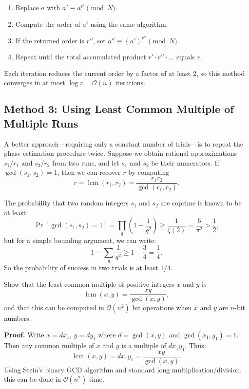 \begin{enumerate}
    \item Replace $a$ with $a' \equiv a^{r'} \pmod{N}$.
    \item Compute the order of $a'$ using the same algorithm.
    \item If the returned order is $r''$, set $a'' \equiv (a')^{r''} \pmod{N}$.
    \item Repeat until the total accumulated product $r' \cdot r'' \cdot \ldots$ equals $r$.
\end{enumerate}

Each iteration reduces the current order by a factor of at least 2, so this method converges in at most $\log r = \mathcal{O}(n)$ iterations.

\subsection{Method 3: Using Least Common Multiple of Multiple Runs}

A better approach—requiring only a constant number of trials—is to repeat the phase estimation procedure twice. Suppose we obtain rational approximations $s_1/r_1$ and $s_2/r_2$ from two runs, and let $s_1$ and $s_2$ be their numerators. If $\gcd(s_1, s_2) = 1$, then we can recover $r$ by computing
\[
r = \operatorname{lcm}(r_1, r_2) = \frac{r_1 r_2}{\gcd(r_1, r_2)}.
\]

The probability that two random integers $s_1$ and $s_2$ are coprime is known to be at least:
\[
\Pr[\gcd(s_1, s_2) = 1] = \prod_q \left(1 - \frac{1}{q^2}\right) \geq \frac{1}{\zeta(2)} = \frac{6}{\pi^2} > \frac{1}{2},
\]
but for a simple bounding argument, we can write:
\[
1 - \sum_q \frac{1}{q^2} \geq 1 - \frac{3}{4} = \frac{1}{4}.
\]
So the probability of success in two trials is at least $1/4$.

\begin{example}
    Show that the least common multiple of positive integers $x$ and $y$ is
    \[
    \operatorname{lcm}(x, y) = \frac{xy}{\gcd(x, y)},
    \]
    and that this can be computed in $\mathcal{O}(n^2)$ bit operations when $x$ and $y$ are $n$-bit numbers.

    \textbf{Proof.} Write $x = d x_1$, $y = d y_1$ where $d = \gcd(x, y)$ and $\gcd(x_1, y_1) = 1$. Then any common multiple of $x$ and $y$ is a multiple of $d x_1 y_1$. Thus:
    \[
    \operatorname{lcm}(x, y) = d x_1 y_1 = \frac{xy}{\gcd(x, y)}.
    \]
    Using Stein’s binary GCD algorithm and standard long multiplication/division, this can be done in $\mathcal{O}(n^2)$ time.
\end{example}

